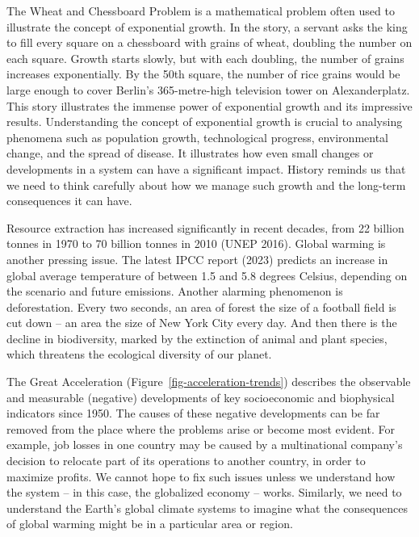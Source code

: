 \documentclass[
  a4paper,
  DIV=11,
  numbers=noendperiod,
  oneside,
  openany]{scrreprt}
\begin{document}
\begin{tcolorbox}[enhanced jigsaw, arc=.35mm, bottomrule=.15mm, bottomtitle=1mm, breakable, colback=white, colbacktitle=quarto-callout-tip-color!10!white, colframe=quarto-callout-tip-color-frame, coltitle=black, left=2mm, leftrule=.75mm, opacityback=0, opacitybacktitle=0.6, rightrule=.15mm, title={The Wheat and Chessboard Problem: an illustration of exponential growth}, titlerule=0mm, toprule=.15mm, toptitle=1mm]

The Wheat and Chessboard Problem is a mathematical problem often used to
illustrate the concept of exponential growth. In the story, a servant
asks the king to fill every square on a chessboard with grains of wheat,
doubling the number on each square. Growth starts slowly, but with each
doubling, the number of grains increases exponentially. By the 50th
square, the number of rice grains would be large enough to cover
Berlin's 365-metre-high television tower on Alexanderplatz. This story
illustrates the immense power of exponential growth and its impressive
results. Understanding the concept of exponential growth is crucial to
analysing phenomena such as population growth, technological progress,
environmental change, and the spread of disease. It illustrates how even
small changes or developments in a system can have a significant impact.
History reminds us that we need to think carefully about how we manage
such growth and the long-term consequences it can have.

\end{tcolorbox}

Resource extraction has increased significantly in recent decades, from
22 billion tonnes in 1970 to 70 billion tonnes in 2010 (UNEP 2016).
Global warming is another pressing issue. The latest IPCC report (2023)
predicts an increase in global average temperature of between 1.5 and
5.8 degrees Celsius, depending on the scenario and future emissions.
Another alarming phenomenon is deforestation. Every two seconds, an area
of forest the size of a football field is cut down -- an area the size
of New York City every day. And then there is the decline in
biodiversity, marked by the extinction of animal and plant species,
which threatens the ecological diversity of our planet.

The Great Acceleration (Figure~\ref{fig-acceleration-trends}) describes
the observable and measurable (negative) developments of key
socioeconomic and biophysical indicators since 1950. The causes of these
negative developments can be far removed from the place where the
problems arise or become most evident. For example, job losses in one
country may be caused by a multinational company's decision to relocate
part of its operations to another country, in order to maximize profits.
We cannot hope to fix such issues unless we understand how the system --
in this case, the globalized economy -- works. Similarly, we need to
understand the Earth's global climate systems to imagine what the
consequences of global warming might be in a particular area or region.
\end{document}
